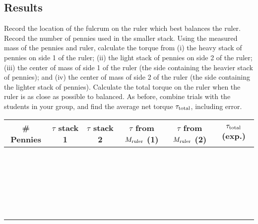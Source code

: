 \documentclass[12pt]{article}
\begin{document}
\subsection{Results}
Record the location of the fulcrum on the ruler which best balances the ruler. Record the number of pennies used in the smaller stack. Using the measured mass of the pennies and ruler, calculate the torque from (i) the heavy stack of pennies on side 1 of the ruler; (ii) the light stack of pennies on side 2 of the ruler; (iii) the center of mass of side 1 of the ruler (the side containing the heavier stack of pennies); and (iv) the center of mass of side 2 of the ruler (the side containing the lighter stack of pennies). Calculate the total torque on the ruler when the ruler is as close as possible to balanced. As before, combine trials with the students in your group, and find the average net torque $\tau_{\rm total}$, including error.

\begin{table}[H]
\centering
 \begin{tabular}{|c|| c |c |c |c | c |} 
 \hline
 \# Pennies & $\tau$ stack 1  & $\tau$ stack 2 & $\tau$ from $M_{\rm ruler}$ (1) & $\tau$ from $M_{\rm ruler}$ (2) & $\tau_{\rm total}$ (exp.)\\ [0.5ex] 
 \hline\hline
 \, & \, & \, & \, & \, & \,\\ 
 \hline
 \, & \, & \, & \, &\, & \, \\
 \hline
 \, & \, & \, & \, &\,& \, \\
 \hline
 \, & \, & \, & \, &\, & \,\\
 \hline
 \, & \, & \, & \, &\, & \,\\ [1ex] 
 \hline
 \end{tabular}
\end{table}
\end{document}
